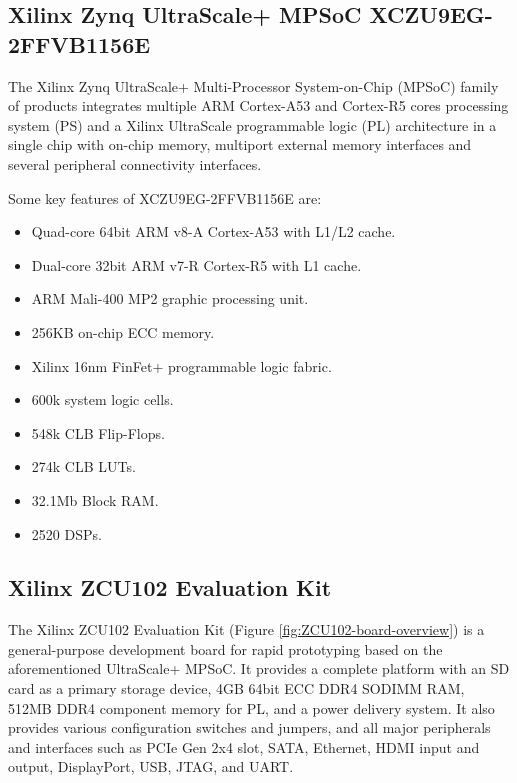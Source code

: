 \subsection{Xilinx Zynq UltraScale+ MPSoC XCZU9EG-2FFVB1156E}
The Xilinx Zynq UltraScale+ Multi-Processor System-on-Chip (MPSoC) \cite{DS891-Zynq-UltraScale-MPSoC-DataSheet-Overview} family of products integrates multiple ARM Cortex-A53 and Cortex-R5 cores processing system (PS) and a Xilinx UltraScale programmable logic (PL) architecture in a single chip with on-chip memory, multiport external memory interfaces and several peripheral connectivity interfaces.

Some key features of XCZU9EG-2FFVB1156E are:
\begin{itemize}
	\item Quad-core 64bit ARM v8-A Cortex-A53 with L1/L2 cache.
	\item Dual-core 32bit ARM v7-R Cortex-R5 with L1 cache.
	\item ARM Mali-400 MP2 graphic processing unit.
	\item 256KB on-chip ECC memory.
	\item Xilinx 16nm FinFet+ programmable logic fabric.
	\item 600k system logic cells.
	\item 548k CLB Flip-Flops.
	\item 274k CLB LUTs.
	\item 32.1Mb Block RAM.
	\item 2520 DSPs.
\end{itemize}

\subsection{Xilinx ZCU102 Evaluation Kit}
The Xilinx ZCU102 Evaluation Kit \cite{ZCU102-User-Guide} \cite{ZCU102-Product-Overview} (Figure \ref{fig:ZCU102-board-overview}) is a general-purpose development board for rapid prototyping based on the aforementioned UltraScale+ MPSoC. It provides a complete platform with an SD card as a primary storage device, 4GB 64bit ECC DDR4 SODIMM RAM, 512MB DDR4 component memory for PL, and a power delivery system. It also provides various configuration switches and jumpers, and all major peripherals and interfaces such as PCIe Gen 2x4 slot, SATA, Ethernet, HDMI input and output, DisplayPort, USB, JTAG, and UART.

